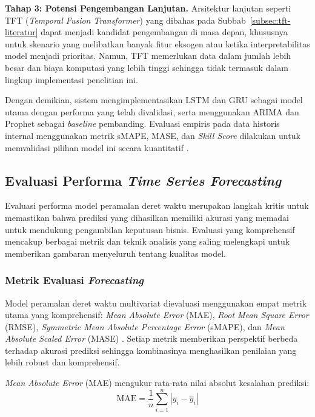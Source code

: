 \textbf{Tahap 3: Potensi Pengembangan Lanjutan.} Arsitektur lanjutan seperti TFT (\textit{Temporal Fusion Transformer}) yang dibahas pada Subbab~\ref{subsec:tft-literatur} dapat menjadi kandidat pengembangan di masa depan, khususnya untuk skenario yang melibatkan banyak fitur eksogen atau ketika interpretabilitas model menjadi prioritas. Namun, TFT memerlukan data dalam jumlah lebih besar dan biaya komputasi yang lebih tinggi sehingga tidak termasuk dalam lingkup implementasi penelitian ini.

Dengan demikian, sistem mengimplementasikan LSTM dan GRU sebagai model utama dengan performa yang telah divalidasi, serta menggunakan ARIMA dan Prophet sebagai \textit{baseline} pembanding. Evaluasi empiris pada data historis internal menggunakan metrik sMAPE, MASE, dan \textit{Skill Score} dilakukan untuk memvalidasi pilihan model ini secara kuantitatif \autocite{Yunita2025NNComparison,Petropoulos2023ForecastEval}.

\subsection{Evaluasi Performa \textit{Time Series Forecasting}}

Evaluasi performa model peramalan deret waktu merupakan langkah kritis untuk memastikan bahwa prediksi yang dihasilkan memiliki akurasi yang memadai untuk mendukung pengambilan keputusan bisnis. Evaluasi yang komprehensif mencakup berbagai metrik dan teknik analisis yang saling melengkapi untuk memberikan gambaran menyeluruh tentang kualitas model.

\subsubsection{Metrik Evaluasi \textit{Forecasting}}

Model peramalan deret waktu multivariat dievaluasi menggunakan empat metrik utama yang komprehensif: \textit{Mean Absolute Error} (MAE), \textit{Root Mean Square Error} (RMSE), \textit{Symmetric Mean Absolute Percentage Error} (sMAPE), dan \textit{Mean Absolute Scaled Error} (MASE) \autocite{Petropoulos2023ForecastEval}. Setiap metrik memberikan perspektif berbeda terhadap akurasi prediksi sehingga kombinasinya menghasilkan penilaian yang lebih robust dan komprehensif.

\textit{Mean Absolute Error} (MAE)\label{sym:MAE} mengukur rata-rata nilai absolut kesalahan prediksi:
\label{sym:yt}\label{sym:yhat}\label{sym:n}\label{sym:abs}
\begin{equation}
\text{MAE} = \frac{1}{n} \sum_{i=1}^n |y_i - \hat{y}_i|
\end{equation}

